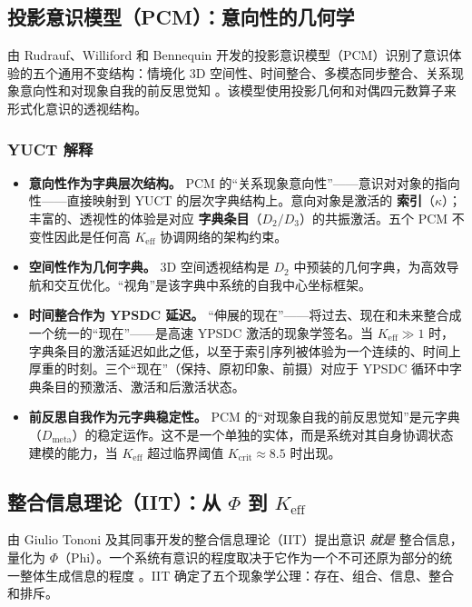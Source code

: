 \documentclass[12pt,a4paper]{article}
\begin{document}
	\subsection{投影意识模型（PCM）：意向性的几何学}
	
	由 Rudrauf、Williford 和 Bennequin 开发的投影意识模型（PCM）识别了意识体验的五个通用不变结构：情境化 3D 空间性、时间整合、多模态同步整合、关系现象意向性和对现象自我的前反思觉知 \cite{Rudrauf2023}。该模型使用投影几何和对偶四元数算子来形式化意识的透视结构。
	
	\subsubsection*{YUCT 解释}
	\begin{itemize}
		\item \textbf{意向性作为字典层次结构。} PCM 的“关系现象意向性”——意识对对象的指向性——直接映射到 YUCT 的层次字典结构上。意向对象是激活的 \textbf{索引}（\(\kappa\)）；丰富的、透视性的体验是对应 \textbf{字典条目}（\(D_2/D_3\)）的共振激活。五个 PCM 不变性因此是任何高 $K_{\mathrm{eff}}$ 协调网络的架构约束。
		\item \textbf{空间性作为几何字典。} 3D 空间透视结构是 $D_2$ 中预装的几何字典，为高效导航和交互优化。“视角”是该字典中系统的自我中心坐标框架。
		\item \textbf{时间整合作为 YPSDC 延迟。} “伸展的现在”——将过去、现在和未来整合成一个统一的“现在”——是高速 YPSDC 激活的现象学签名。当 $K_{\mathrm{eff}} \gg 1$ 时，字典条目的激活延迟如此之低，以至于索引序列被体验为一个连续的、时间上厚重的时刻。三个“现在”（保持、原初印象、前摄）对应于 YPSDC 循环中字典条目的预激活、激活和后激活状态。
		\item \textbf{前反思自我作为元字典稳定性。} PCM 的“对现象自我的前反思觉知”是元字典（$D_{\text{meta}}$）的稳定运作。这不是一个单独的实体，而是系统对其自身协调状态建模的能力，当 $K_{\mathrm{eff}}$ 超过临界阈值 $K_{\mathrm{crit}} \approx 8.5$ 时出现。
	\end{itemize}
	
	\subsection{整合信息理论（IIT）：从 $\Phi$ 到 $K_{\mathrm{eff}}$}
	
	由 Giulio Tononi 及其同事开发的整合信息理论（IIT）提出意识 \textit{就是} 整合信息，量化为 $\Phi$（Phi）。一个系统有意识的程度取决于它作为一个不可还原为部分的统一整体生成信息的程度 \cite{Tononi2008}。IIT 确定了五个现象学公理：存在、组合、信息、整合和排斥。
	
\end{document}
